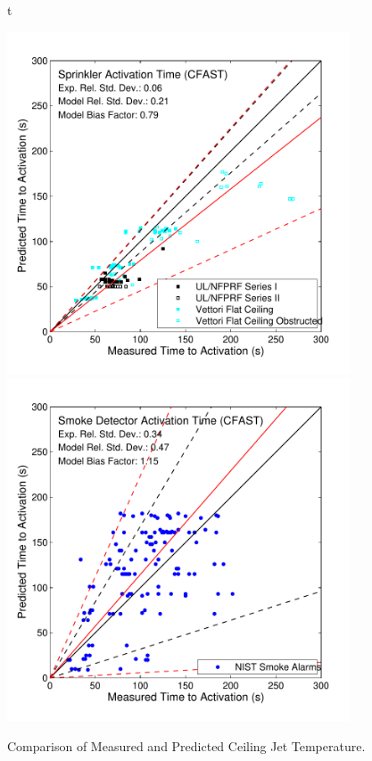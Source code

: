 \begin{figure}{t}
\begin{center}
\includegraphics[width=4.0in]{FIGURES/ScatterPlots/Sprinkler_Activation_Time}  \\
\includegraphics[width=4.0in]{FIGURES/ScatterPlots/Smoke_Alarm_Activation_Time}
\end{center}
\caption{Comparison of Measured and Predicted Ceiling Jet Temperature.} \label{fig:Activation_Scatter}
\end{figure}

